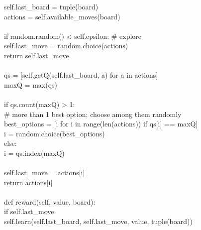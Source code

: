 \documentclass[a4paper, 12pt, notitlepage]{report}
\begin{document}
    \hspace*{8ex}    self.last\_board = tuple(board)\\
    \hspace*{8ex}    actions = self.available\_moves(board)\\
\\
    \hspace*{8ex}    if random.random() < self.epsilon: \# explore\\
    \hspace*{12ex}        self.last\_move = random.choice(actions)\\
    \hspace*{12ex}        return self.last\_move\\
\\
    \hspace*{8ex}    qs = [self.getQ(self.last\_board, a) for a in actions]\\
    \hspace*{8ex}    maxQ = max(qs)\\
\\
   \hspace*{8ex}     if qs.count(maxQ) > 1:\\
   \hspace*{12ex}         \# more than 1 best option; choose among them randomly\\
   \hspace*{12ex}         best\_options = [i for i in range(len(actions)) if qs[i] == maxQ]\\
   \hspace*{12ex}         i = random.choice(best\_options)\\
   \hspace*{8ex}     else:\\
   \hspace*{12ex}         i = qs.index(maxQ)\\
\\
   \hspace*{8ex}     self.last\_move = actions[i]\\
   \hspace*{8ex}     return actions[i]\\
\\
   \hspace*{4ex} def reward(self, value, board):\\
   \hspace*{8ex}     if self.last\_move:\\
   \hspace*{12ex}         self.learn(self.last\_board, self.last\_move, value, tuple(board))\\
\end{document}
